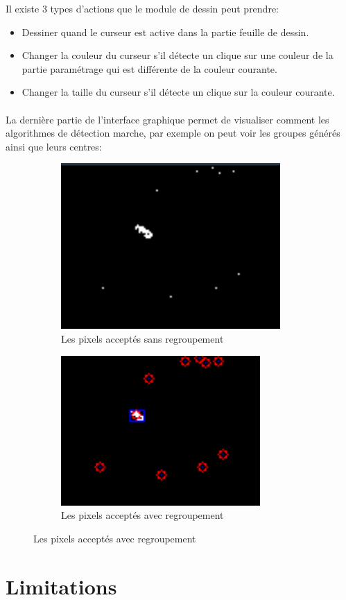 \documentclass[12pt]{report}
\begin{document}
	Il existe 3 types d’actions que le module de dessin peut prendre:
	\begin{itemize}
		\item Dessiner quand le curseur est active dans la partie feuille de dessin.
		\item Changer la couleur du curseur s’il détecte un clique sur une couleur de la partie paramétrage qui est différente de la couleur courante.
		\item Changer la taille du curseur s’il détecte un clique sur la couleur courante.  
	\end{itemize}
	\paragraph{}
	La dernière partie de l’interface graphique permet de visualiser comment les algorithmes de détection marche, par exemple on peut voir les groupes générés ainsi que leurs centres:
	\begin{figure}
		\centering
		\begin{subfigure}{.5\textwidth}
			\centering
			\includegraphics[width=.4\linewidth]{imgs/notGrouped.png}
			\caption{Les pixels acceptés sans regroupement}
			\label{fig:sub1}
		\end{subfigure}%
		\begin{subfigure}{.5\textwidth}
			\centering
			\includegraphics[width=.4\linewidth]{imgs/grouped.png}
			\caption{Les pixels acceptés avec regroupement}
			\label{fig:sub2}
		\end{subfigure}
		\label{fig:test}
	\end{figure}
	\section{Limitations}
\end{document}
